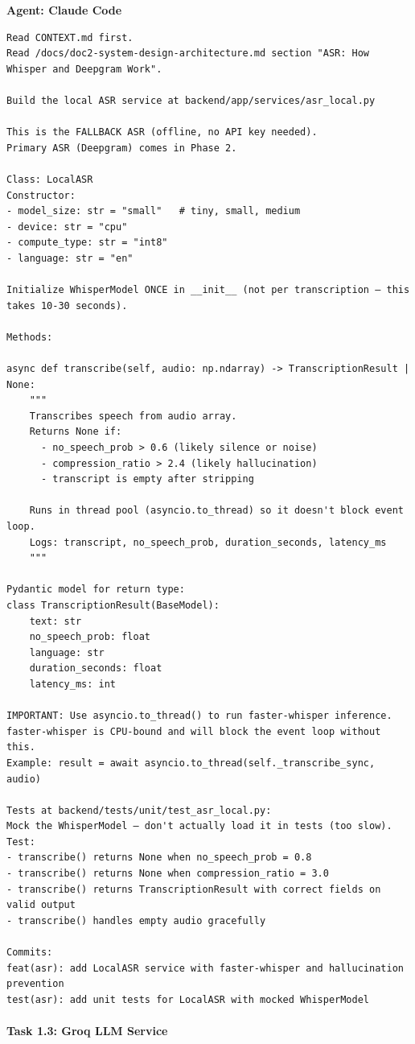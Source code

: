 \documentclass[
  11pt,
]{article}
\begin{document}
\textbf{Agent: Claude Code}

\begin{lstlisting}
Read CONTEXT.md first.
Read /docs/doc2-system-design-architecture.md section "ASR: How Whisper and Deepgram Work".

Build the local ASR service at backend/app/services/asr_local.py

This is the FALLBACK ASR (offline, no API key needed).
Primary ASR (Deepgram) comes in Phase 2.

Class: LocalASR
Constructor:
- model_size: str = "small"   # tiny, small, medium
- device: str = "cpu"
- compute_type: str = "int8"
- language: str = "en"

Initialize WhisperModel ONCE in __init__ (not per transcription — this takes 10-30 seconds).

Methods:

async def transcribe(self, audio: np.ndarray) -> TranscriptionResult | None:
    """
    Transcribes speech from audio array.
    Returns None if:
      - no_speech_prob > 0.6 (likely silence or noise)
      - compression_ratio > 2.4 (likely hallucination)
      - transcript is empty after stripping

    Runs in thread pool (asyncio.to_thread) so it doesn't block event loop.
    Logs: transcript, no_speech_prob, duration_seconds, latency_ms
    """

Pydantic model for return type:
class TranscriptionResult(BaseModel):
    text: str
    no_speech_prob: float
    language: str
    duration_seconds: float
    latency_ms: int

IMPORTANT: Use asyncio.to_thread() to run faster-whisper inference.
faster-whisper is CPU-bound and will block the event loop without this.
Example: result = await asyncio.to_thread(self._transcribe_sync, audio)

Tests at backend/tests/unit/test_asr_local.py:
Mock the WhisperModel — don't actually load it in tests (too slow).
Test:
- transcribe() returns None when no_speech_prob = 0.8
- transcribe() returns None when compression_ratio = 3.0
- transcribe() returns TranscriptionResult with correct fields on valid output
- transcribe() handles empty audio gracefully

Commits:
feat(asr): add LocalASR service with faster-whisper and hallucination prevention
test(asr): add unit tests for LocalASR with mocked WhisperModel
\end{lstlisting}

\hypertarget{task-1.3-groq-llm-service}{%
\paragraph{Task 1.3: Groq LLM Service}\label{task-1.3-groq-llm-service}}
\end{document}
